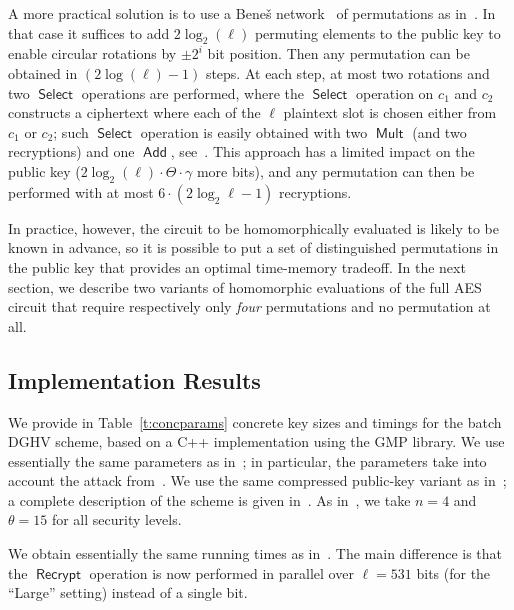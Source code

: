 \documentclass[11pt]{llncs}
\DeclareMathOperator{\Recrypt}{\ensuremath{\mathsf{Recrypt}}}
\DeclareMathOperator{\Add}{\ensuremath{\mathsf{Add}}}
\DeclareMathOperator{\Mult}{\ensuremath{\mathsf{Mult}}}
\DeclareMathOperator{\Select}{\ensuremath{\mathsf{Select}}}
\newcommand\ignore[1]{}
\begin{document}
A more practical solution is to use a Bene\v{s} network~\cite{Ben1964} of
permutations as in~\cite{GHS2012a}. In that case it suffices to add
$2\log_2(\ell)$ permuting elements to the public key to enable circular
rotations by $\pm 2^i$ bit position. Then any permutation can be obtained
in $(2\log(\ell)-1)$ steps. At each step, at most two rotations and two
$\Select$ operations are performed, where the $\Select$ operation on
$c_1$ and $c_2$ constructs a ciphertext where each of the $\ell$
plaintext slot is chosen either from $c_1$ or $c_2$; such $\Select$
operation is easily obtained with two $\Mult$ (and two recryptions)
and one $\Add$, see~\cite{GHS2012a}. This approach has a
limited impact on the public key ($2\log_2(\ell)\cdot \Theta\cdot \gamma$
more bits), and any permutation can then be performed with at most
$6 \cdot (2 \log_2 \ell-1)$ recryptions.

In practice, however, the circuit to be homomorphically evaluated is
likely to be known in advance, so it is possible to put a set of
distinguished permutations in the public key that provides an optimal
time-memory tradeoff. In the next section, we describe two variants of
homomorphic evaluations of the full AES circuit that require respectively only
\emph{four} permutations and no permutation
at all.

\subsection{Implementation Results}\label{subsec:practical-implementation}

We provide  in Table~\ref{t:concparams} concrete key sizes and timings
for the batch DGHV scheme\ignore{ of Section~\ref{sec:batch-error-free}}, 
based on a C++ implementation using the GMP
library. We use essentially the same parameters as
in~\cite{CNT2012,FHEGITHUB}; in particular, the parameters take into
account the attack from~\cite{CN2012}. We use the same compressed
public-key variant as in~\cite{CNT2012}; a complete
description of the scheme is given in~\cite{CLT2013a}.   As
in~\cite{CMNT2011,CNT2012}, we take $n=4$ and $\theta=15$ for all
security levels. 

We obtain essentially the same running times as in~\cite{CNT2012}. The
main difference is that the $\Recrypt$ operation is now performed in
parallel over $\ell=531$ bits (for the ``Large'' setting) instead of a
single bit. 
\end{document}
